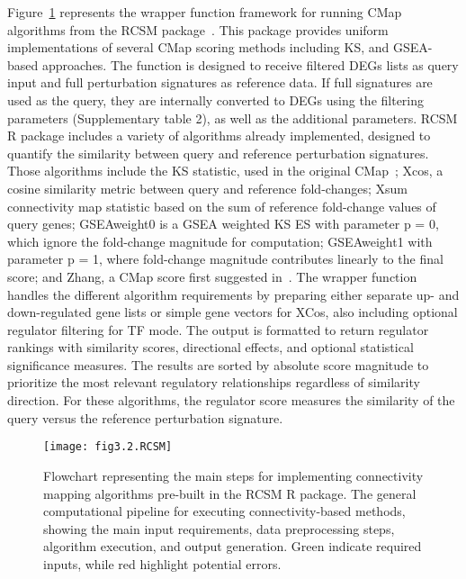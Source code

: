Figure~\ref{fig:fig3.2.RCSM} represents the wrapper function framework for running \gls{CMap} algorithms from the \gls{RCSM} package~\cite{RN79}. 
This package provides uniform implementations of several \gls{CMap} scoring methods including \gls{KS}, and \gls{GSEA}-based approaches. 
The function is designed to receive filtered \gls{DEGs} lists as query input and full perturbation signatures as reference data. 
If full signatures are used as the query, they are internally converted to \gls{DEGs} using the filtering parameters (Supplementary table 2), as well as the additional parameters. \gls{RCSM} \gls{R} package includes a variety of algorithms already implemented, designed to quantify the similarity between query and reference perturbation signatures. 
Those algorithms include the \gls{KS} statistic, used in the original \gls{CMap}~\cite{RN34}; Xcos, a cosine similarity metric between query and reference fold-changes; Xsum connectivity map statistic based on the sum of reference fold-change values of query genes; GSEAweight0 is a \gls{GSEA} weighted KS ES with parameter p = 0, which ignore the fold-change magnitude for computation; GSEAweight1 with parameter p = 1, where fold-change magnitude contributes linearly to the final score; and Zhang, a \gls{CMap} score first suggested in~\cite{RN161}. 
The wrapper function handles the different algorithm requirements by preparing either separate up- and down-regulated gene lists or simple gene vectors for XCos, also including optional regulator filtering for \gls{TF} mode. 
The output is formatted to return regulator rankings with similarity scores, directional effects, and optional statistical significance measures. 
The results are sorted by absolute score magnitude to prioritize the most relevant regulatory relationships regardless of similarity direction. 
For these algorithms, the regulator score measures the similarity of the query versus the reference perturbation signature.


\begin{figure}[htbp]
    \centering
    \texttt{[image: fig3.2.RCSM]}
    \caption{Flowchart representing the main steps for implementing connectivity mapping algorithms pre-built in the RCSM R package. The general computational pipeline for executing connectivity-based methods, showing the main input requirements, data preprocessing steps, algorithm execution, and output generation. Green indicate required inputs, while red highlight potential errors.}
    \label{fig:fig3.2.RCSM}
\end{figure}


